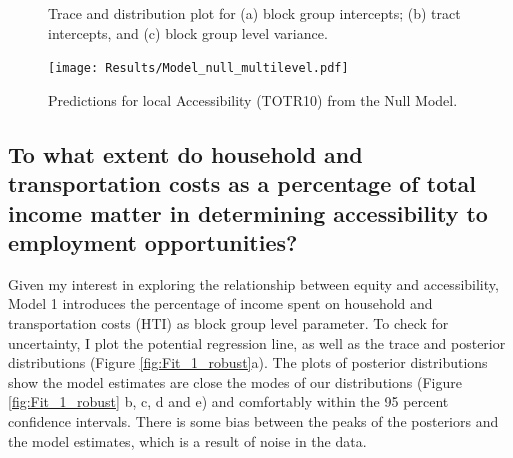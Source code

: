 \documentclass[a4paper,UKenglish]{lipics-v2018}
\begin{document}
\begin{figure}[H]
    \centering
    \caption[Null Model Trace and Posterior plots]{Trace and distribution plot for (a) block group intercepts; (b) tract intercepts, and (c) block group level variance.} 
    \label{fig:Fit_null_robust}
\end{figure}

\begin{figure}[H]
    \centering
    \texttt{[image: Results/Model\_null\_multilevel.pdf]}
    \caption[Null Model predictions]{Predictions for local Accessibility (TOTR10) from the Null Model.} 
    \label{fig:Model_null_multilevel}
\end{figure}

\subsection{To what extent do household and transportation costs as a percentage of total income matter in determining accessibility to employment opportunities?}
Given my interest in exploring the relationship between equity and accessibility, Model 1 introduces the percentage of income spent on household and transportation costs (HTI) as  block group level parameter. To check for uncertainty, I plot the potential regression line, as well as the trace and posterior distributions (Figure \ref{fig:Fit_1_robust}a). The plots of posterior distributions show the model estimates are close the modes of our distributions (Figure \ref{fig:Fit_1_robust} b, c, d and e) and comfortably within the 95 percent confidence intervals. There is some bias between the peaks of the posteriors and the model estimates, which is a result of noise in the data. 		
\end{document}
